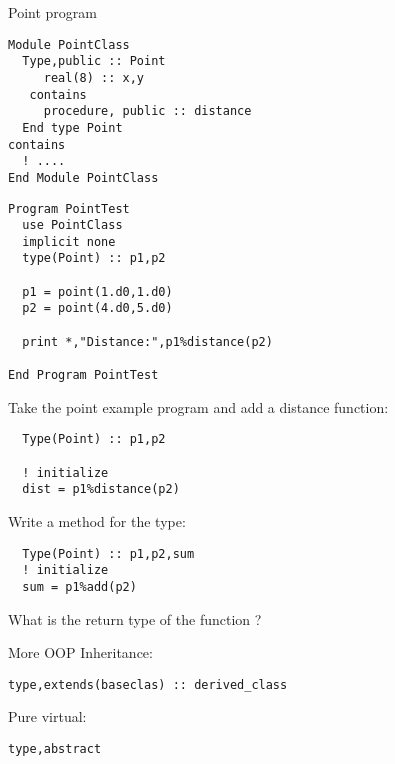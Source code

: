 \begin{block}{Point program}
  \label{sl:fpoint-program}
  \footnotesize
  
  \begin{multicols}{2}
\begin{lstlisting}
Module PointClass
  Type,public :: Point
     real(8) :: x,y
   contains
     procedure, public :: distance
  End type Point
contains
  ! ....
End Module PointClass
\end{lstlisting}
\columnbreak
\begin{lstlisting}
Program PointTest
  use PointClass
  implicit none
  type(Point) :: p1,p2

  p1 = point(1.d0,1.d0)
  p2 = point(4.d0,5.d0)

  print *,"Distance:",p1%distance(p2)

End Program PointTest
\end{lstlisting}
  \end{multicols}  
\end{block}

\begin{exercise}
  \label{ex:fclass-point-distance}
  Take the point example program and add a distance function:
\begin{lstlisting}
  Type(Point) :: p1,p2
  
  ! initialize
  dist = p1%distance(p2)
\end{lstlisting}
\end{exercise}

\begin{exercise}
  \label{ex:fclass-translate}
  Write a method  for the  type:
\begin{lstlisting}
  Type(Point) :: p1,p2,sum
  ! initialize
  sum = p1%add(p2)
\end{lstlisting}
  What is the return type of the function ?
\end{exercise}

\begin{block}{More OOP}
  \label{sl:oopf}
Inheritance:
\begin{lstlisting}
type,extends(baseclas) :: derived_class
\end{lstlisting}
Pure virtual:
\begin{lstlisting}
type,abstract
\end{lstlisting}
\end{block}

\endinput

\begin{block}{Use modules!}
  \label{sl:fclass-module}
   It is of course best to put the type definition and method
   definitions in a module, so that you can \n{use} it.

   Mark methods as \n{private} so that they can only be used as part
   of the \n{type}:

   \verbatimsnippet{classmodule}
\end{block}

